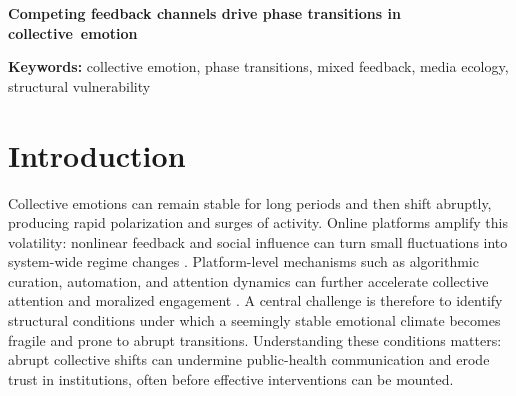\documentclass[11pt]{article}
\begin{document}
\linenumbers %

\begin{center}
{\LARGE\bfseries Competing feedback channels drive phase transitions in collective~emotion}
\end{center}

\vspace{1em}

\begin{abstract}
Sudden polarization can emerge on social platforms even without commensurate external shocks. We propose that such fragility builds endogenously in mixed information ecologies, where stabilizing mainstream channels compete with amplifying user-generated channels. A minimal mixed-feedback model identifies a critical channel-balance boundary beyond which the neutral state destabilizes into self-sustaining polarization. Mapping the parameter landscape shows how vulnerability shifts with response sensitivity, media ecology, and local coupling, and explains why elevated activity signals heightened fragility: the moderate buffer can deplete before a polarized direction is selected. Agent-based simulations show that these patterns persist under networked interactions. In large-scale online discussions, segments with elevated activity exhibit larger polarization jumps, and, under sufficiently dense temporal sampling, greater user-generated dominance covaries with higher polarization volatility. Managing channel balance---through exposure mixing or algorithmic adjustment---may complement content moderation in preserving collective resilience.
\end{abstract}

\noindent\textbf{Keywords:} collective emotion, phase transitions, mixed feedback, media ecology, structural vulnerability

\section{Introduction}
Collective emotions can remain stable for long periods and then shift abruptly, producing rapid polarization and surges of activity. Online platforms amplify this volatility: nonlinear feedback and social influence can turn small fluctuations into system-wide regime changes \citep{Centola2010,Watts2002,Becker2017}. Platform-level mechanisms such as algorithmic curation, automation, and attention dynamics can further accelerate collective attention and moralized engagement \citep{Lazer2018,LorenzSpreen2019,Crockett2017}. A central challenge is therefore to identify structural conditions under which a seemingly stable emotional climate becomes fragile and prone to abrupt transitions. Understanding these conditions matters: abrupt collective shifts can undermine public-health communication and erode trust in institutions, often before effective interventions can be mounted.
\end{document}
